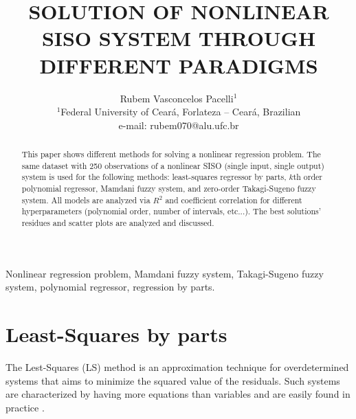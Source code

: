 \documentclass[english]{sobraep}
\title{SOLUTION OF NONLINEAR SISO SYSTEM THROUGH DIFFERENT PARADIGMS}
\author{Rubem Vasconcelos Pacelli$^{1}$\\
	\normalsize $^{1}$Federal University of Ceará, Forlateza -- Ceará, Brazilian\\
	\normalsize e-mail: rubem070@alu.ufc.br
}
\begin{document}
\maketitle

\begin{abstract}
	This paper shows different methods for solving a nonlinear regression problem. The same dataset with 250 observations of a nonlinear SISO (single input, single output) system is used for the following methods: least-squares regressor by parts, $k$th order polynomial regressor, Mamdani fuzzy system, and zero-order Takagi-Sugeno fuzzy system. All models are analyzed via $R^2$ and coefficient correlation for different hyperparameters (polynomial order, number of intervals, etc...). The best solutions' residues and scatter plots are analyzed and discussed.
\end{abstract}

\begin{keywords}
	Nonlinear regression problem, Mamdani fuzzy system, Takagi-Sugeno fuzzy system, polynomial regressor, regression by parts. 
\end{keywords}






\section{Least-Squares by parts}

The Lest-Squares (LS) method is an approximation technique for overdetermined systems that aims to minimize the squared value of the residuals. Such systems are characterized by having more equations than variables and are easily found in practice \cite{kay1993fundamentals}.
\end{document}
